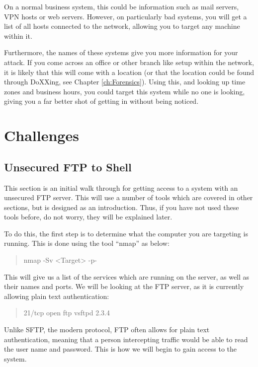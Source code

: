 \documentclass[a4paper,11pt]{report}
\begin{document}
				On a normal business system, this could be information such as mail servers, VPN hosts or web servers. 
				However, on particularly bad systems, you will get a list of all hosts connected to the network, allowing you to target any machine within it. 

				Furthermore, the names of these systems give you more information for your attack. 
				If you come across an office or other branch like setup within the network, it is likely that this will come with a location (or that the location could be found through DoXXing, see Chapter \ref{ch:Forensics}). 
				Using this, and looking up time zones and business hours, you could target this system while no one is looking, 
				giving you a far better shot of getting in without being noticed. 

	\section{Challenges}
		\subsection{Unsecured FTP to Shell}
			This section is an initial walk through for getting access to a system with an unsecured FTP server. 
			This will use a number of tools which are covered in other sections, but is designed as an introduction. 
			Thus, if you have not used these tools before, do not worry, they will be explained later. 

			To do this, the first step is to determine what the computer you are targeting is running. 
			This is done using the tool ``nmap'' as below:
			\begin{quote}
				nmap -Sv <Target> -p-
			\end{quote}
			This will give us a list of the services which are running on the server, as well as their names and ports. 
			We will be looking at the FTP server, as it is currently allowing plain text authentication:
			\begin{quote}
				21/tcp    open  ftp         vsftpd 2.3.4
			\end{quote}
			Unlike SFTP, the modern protocol, FTP often allows for plain text authentication, meaning that a person intercepting traffic would be able to read the user name and password. 
			This is how we will begin to gain access to the system. 
\end{document}
